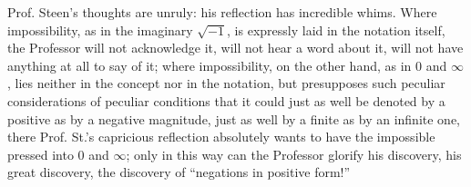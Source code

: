 \documentclass[12pt,a4paper,openany]{book}
\begin{document}
Prof. Steen's thoughts are unruly: his reflection has incredible whims. Where impossibility, as
in the imaginary $\sqrt{-1}$, is expressly laid in the notation
itself, the Professor will not acknowledge it, will not hear a word about
it, will not have anything at all to say of it; where impossibility,
on the other hand, as in $0$ and $\infty$, lies neither in the concept
nor in the notation, but presupposes such peculiar considerations of
peculiar conditions that it could just as well be denoted by
a positive as by a negative magnitude, just as well by a finite
as by an infinite one, there Prof. St.'s capricious reflection absolutely wants to have the impossible pressed into $0$ and $\infty$;
only in this way can the Professor glorify his discovery, his great discovery, the discovery of ``negations in positive form!''
\end{document}
